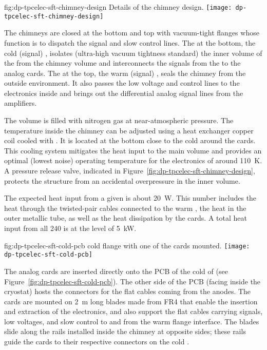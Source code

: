 \begin{dunefigure}{fig:dp-tpcelec-sft-chimney-design}
{Details of the  chimney design.}
\texttt{[image: dp-tpcelec-sft-chimney-design]}
\end{dunefigure}

The chimneys are closed at the bottom and top with vacuum-tight \fdth flanges whose function is to dispatch the signal and slow control lines. The \fdth at the bottom, the cold (signal) \fdth, isolates (ultra-high vacuum tightness standard) the inner volume of the  from the chimney volume and interconnects the signals from the  to the analog  cards. The \fdth at the top, the warm (signal) \fdth, seals the chimney from the outside environment. It also passes the low voltage and control lines to the  electronics inside and brings out the differential analog signal lines from the  amplifiers. 

The  volume is filled with nitrogen gas at near-atmospheric pressure. The temperature inside the chimney can be adjusted using a heat exchanger copper coil cooled with \lar. It is located at the bottom close to the cold \fdth around the  cards. %
This cooling system %
mitigates the heat input to the main  volume and provides an optimal (lowest noise) operating temperature for the  electronics of around \SI{110}{K}. A pressure release valve, indicated in Figure~\ref{fig:dp-tpcelec-sft-chimney-design}, protects the structure from an accidental overpressure in the inner volume. 

The expected heat input from a given  is about \SI{20}{\watt}. This number includes the heat through the twisted-pair cables connected to the warm \fdth, the heat in the   outer metallic tube, as well as the heat dissipation by the  cards. A total heat input from all \num{240}  is at the level of \SI{5}{\kilo\watt}. 

\begin{dunefigure}{fig:dp-tpcelec-sft-cold-pcb}
{ cold \fdth flange with one of the  cards mounted.}
\texttt{[image: dp-tpcelec-sft-cold-pcb]}
\end{dunefigure}
The analog  cards are inserted directly onto the PCB of the cold \fdth of 
(see Figure~\ref{fig:dp-tpcelec-sft-cold-pcb}). The other side of the PCB (facing inside the cryostat) hosts the connectors for the flat cables coming from the  anodes.  The  cards are mounted on \SI{2}{\m} long blades made from FR4 that enable the insertion and extraction of the electronics, and also support the flat cables carrying signals, low voltages, and slow control to and from the warm flange interface.  The blades slide along the rails installed inside the chimney at opposite sides; %
these rails guide the  cards to their respective connectors on the cold \fdth. 

